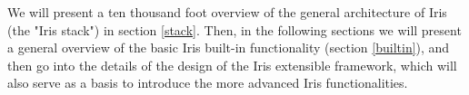 We will present a ten thousand foot overview of the general architecture of Iris (the "Iris stack") in section \ref{stack}. Then, in the following sections we will present a general overview of the basic Iris built-in functionality (section \ref{builtin}), and then go into the details of the design of the Iris extensible framework, which will also serve as a basis to introduce the more advanced Iris functionalities.